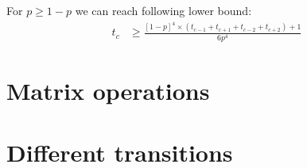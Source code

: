 \documentclass[]{book}
\theoremstyle{definition}
\begin{document}
For $p \ge 1-p$ we can reach following lower bound:
\begin{equation}
\begin{split}
    t_c & \ge \frac{\left[ 1-p \right]^4 \times \left( t_{c-1} + t_{c+1} + t_{c-2} + t_{c+2} \right) + 1}{6p^4}
\end{split}
\end{equation}





\section{Matrix operations}


\section{Different transitions}
\end{document}
